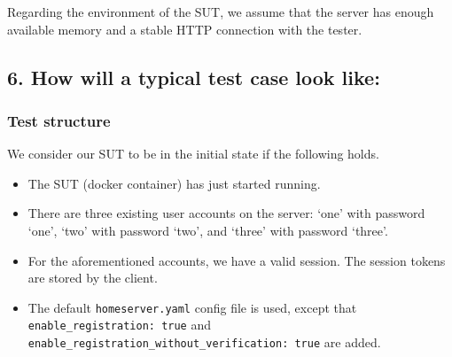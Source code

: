 \documentclass{article}
\begin{document}
Regarding the environment of the SUT, we assume that the server has enough available memory and a stable HTTP connection with the tester.

\subsection*{6. How will a typical test case look like:}
\subsubsection*{Test structure}
We consider our SUT to be in the initial state if the following holds.
\begin{itemize}
    \item The SUT (docker container) has just started running.
    \item There are three existing user accounts on the server: `one' with password `one', `two' with password `two', and `three' with password `three'.
    \item For the aforementioned accounts, we have a valid session. The session tokens are stored by the client.
    \item The default \texttt{homeserver.yaml} config file is used, 
    except that \texttt{enable\_registration: true} and 
    \texttt{enable\_registration\_without\_verification: true} are 
    added.
\end{itemize}
\end{document}
